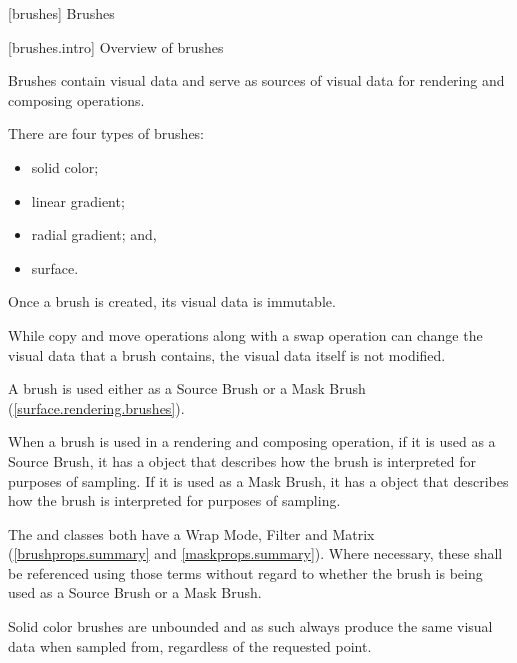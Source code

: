 
 [brushes] {Brushes}

 [brushes.intro] {Overview of brushes}

\pnum
Brushes contain visual data and serve as sources of visual data for rendering and composing operations.

\pnum
There are four types of brushes:
\begin{itemize}
	\item solid color;
	\item linear gradient;
	\item radial gradient; and,
	\item surface.
\end{itemize}

\pnum
Once a brush is created, its visual data is immutable.

\pnum
\enternote
While copy and move operations along with a swap operation can change the visual data that a brush contains, the visual data itself is not modified.
\exitnote

\pnum
A brush is used either as a Source Brush or a Mask Brush (\ref{surface.rendering.brushes}).

\pnum
When a brush is used in a rendering and composing operation, if it is used as a Source Brush, it has a  object that describes how the brush is interpreted for purposes of sampling. If it is used as a Mask Brush, it has a  object that describes how the brush is interpreted for purposes of sampling.

\pnum
The  and  classes both have a Wrap Mode, Filter and Matrix (\ref{brushprops.summary} and \ref{maskprops.summary}). Where necessary, these shall be referenced using those terms without regard to whether the brush is being used as a Source Brush or a Mask Brush.


%
%
%
%
%
%
\pnum
Solid color brushes are unbounded and as such always produce the same visual data when sampled from, regardless of the requested point.


